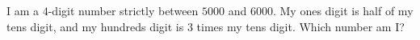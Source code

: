 I am a $4$-digit number strictly between $5000$ and $6000$. My ones digit is half of my tens digit, and my hundreds digit is $3$ times my tens digit. Which number am I?
